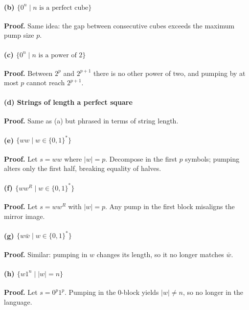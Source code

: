 \documentclass{article}
\theoremstyle{theorem}
\theoremstyle{definition}
\theoremstyle{remark}
\begin{document}
\paragraph{(b) \(\{0^n\mid n\text{ is a perfect cube}\}\)}
\textbf{Proof.} Same idea: the gap between consecutive cubes exceeds the maximum pump size \(p\).

\paragraph{(c) \(\{0^n\mid n\text{ is a power of 2}\}\)}
\textbf{Proof.} Between \(2^p\) and \(2^{p+1}\) there is no other power of two, and pumping by at most \(p\) cannot reach \(2^{p+1}\).

\paragraph{(d) Strings of length a perfect square}
\textbf{Proof.} Same as (a) but phrased in terms of string length.

\paragraph{(e) \(\{ww\mid w\in\{0,1\}^*\}\)}
\textbf{Proof.} Let \(s=ww\) where \(\lvert w\rvert=p\). Decompose in the first \(p\) symbols; pumping alters only the first half, breaking equality of halves.

\paragraph{(f) \(\{ww^R\mid w\in\{0,1\}^*\}\)}
\textbf{Proof.} Let \(s= w w^R\) with \(\lvert w\rvert=p\). Any pump in the first block misaligns the mirror image.

\paragraph{(g) \(\{w\bar w\mid w\in\{0,1\}^*\}\)}
\textbf{Proof.} Similar: pumping in \(w\) changes its length, so it no longer matches \(\bar w\).

\paragraph{(h) \(\{w1^n\mid |w|=n\}\)}
\textbf{Proof.} Let \(s=0^p1^p\). Pumping in the 0-block yields \(|w|\neq n\), so no longer in the language.
\end{document}
